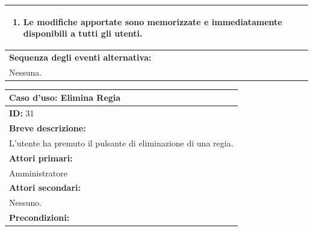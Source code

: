 \documentclass{article}
\begin{document}
\begin{table}[H]
\begin{tabular}{|p{\linewidth}|}
\begin{minipage}{\linewidth}
\begin{enumerate}
                                \item Le modifiche apportate sono memorizzate e immediatamente disponibili a tutti gli utenti.
                            \end{enumerate}
                        \end{minipage} \\
                        \hline
                        \textbf{Sequenza degli eventi alternativa:} \\
                        Nessuna. \\
                        \hline
                    \end{tabular}
                \end{table}

                \begin{table}[H]
                    \begin{tabular}{|p{\linewidth}|}
                        \hline
                        \cellcolor{gray!100}
                        \color{white}
                        \centerline{\textbf{Caso d'uso:} Elimina Regia} \\
                        \hline
                        \textbf{ID:} 31 \\
                        \hline
                        \cellcolor{gray!20}
                        \textbf{Breve descrizione:} \\
                        \cellcolor{gray!20}
                        L'utente ha premuto il pulsante di eliminazione di una regia. \\
                        \hline
                        \textbf{Attori primari:} \\
                        \begin{minipage}{\linewidth}
                            Amministratore
                        \end{minipage}
                        \vspace{-10pt} \\  %
                        \hline
                        \textbf{Attori secondari:} \\
                        Nessuno. \\
                        \hline
                        \cellcolor{gray!20}
                        \textbf{Precondizioni:} \\

\end{tabular}
\end{table}
\end{document}

